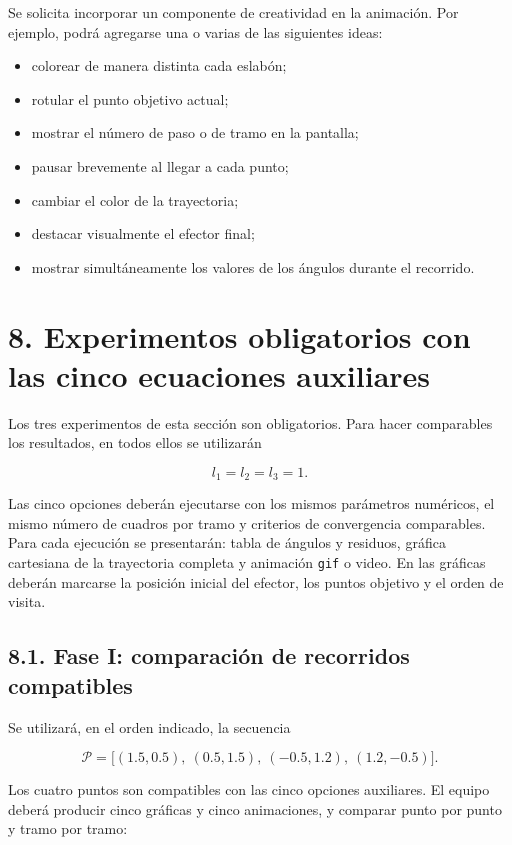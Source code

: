 \documentclass[12pt]{article}
\begin{document}
Se solicita incorporar un componente de creatividad en la animación. Por ejemplo, podrá agregarse una o varias de las siguientes ideas:

\begin{itemize}
    \item colorear de manera distinta cada eslabón;
    \item rotular el punto objetivo actual;
    \item mostrar el número de paso o de tramo en la pantalla;
    \item pausar brevemente al llegar a cada punto;
    \item cambiar el color de la trayectoria;
    \item destacar visualmente el efector final;
    \item mostrar simultáneamente los valores de los ángulos durante el recorrido.
\end{itemize}

\section*{8. Experimentos obligatorios con las cinco ecuaciones auxiliares}

Los tres experimentos de esta sección son obligatorios. Para hacer comparables los resultados, en todos ellos se utilizarán

\[
l_1=l_2=l_3=1.
\]

Las cinco opciones deberán ejecutarse con los mismos parámetros numéricos, el mismo número de cuadros por tramo y criterios de convergencia comparables. Para cada ejecución se presentarán: tabla de ángulos y residuos, gráfica cartesiana de la trayectoria completa y animación \texttt{gif} o video. En las gráficas deberán marcarse la posición inicial del efector, los puntos objetivo y el orden de visita.

\subsection*{8.1. Fase I: comparación de recorridos compatibles}

Se utilizará, en el orden indicado, la secuencia

\[
\mathcal{P}=\bigl[(1.5,0.5),\ (0.5,1.5),\ (-0.5,1.2),\ (1.2,-0.5)\bigr].
\]

Los cuatro puntos son compatibles con las cinco opciones auxiliares. El equipo deberá producir cinco gráficas y cinco animaciones, y comparar punto por punto y tramo por tramo:
\end{document}
